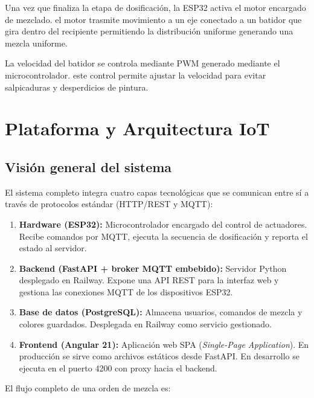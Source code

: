 \documentclass[conference]{IEEEtran}
\begin{document}
Una vez que finaliza la etapa de dosificaci\'on, la ESP32 activa el motor encargado de mezclado. el motor trasmite movimiento a un eje conectado a un batidor que gira dentro del recipiente permitiendo la distribuci\'on uniforme generando una mezcla uniforme.

La velocidad del batidor se controla mediante PWM generado mediante  el microcontrolador. este control permite ajustar la velocidad para evitar salpicaduras y desperdicios de pintura.

\section{Plataforma y Arquitectura IoT}

\subsection{Visi\'on general del sistema}

El sistema completo integra cuatro capas tecnol\'ogicas que se comunican entre s\'i a trav\'es de protocolos est\'andar (HTTP/REST y MQTT):

\begin{enumerate}
    \item \textbf{Hardware (ESP32):} Microcontrolador encargado del control de actuadores. Recibe comandos por MQTT, ejecuta la secuencia de dosificaci\'on y reporta el estado al servidor.
    \item \textbf{Backend (FastAPI + broker MQTT embebido):} Servidor Python desplegado en Railway. Expone una API REST para la interfaz web y gestiona las conexiones MQTT de los dispositivos ESP32.
    \item \textbf{Base de datos (PostgreSQL):} Almacena usuarios, comandos de mezcla y colores guardados. Desplegada en Railway como servicio gestionado.
    \item \textbf{Frontend (Angular 21):} Aplicaci\'on web SPA (\textit{Single-Page Application}). En producci\'on se sirve como archivos est\'aticos desde FastAPI. En desarrollo se ejecuta en el puerto 4200 con proxy hacia el backend.
\end{enumerate}

El flujo completo de una orden de mezcla es:
\end{document}
